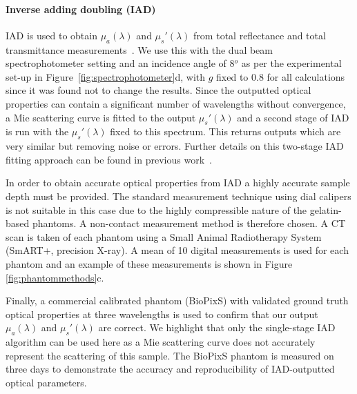 \paragraph{Inverse adding doubling (IAD)}\label{sec:methodsphantommeasure2}
IAD is used to obtain $\mu_a(\lambda)$ and $\mu_s'(\lambda)$ from total reflectance and total transmittance measurements~\citep{Prahl2017}. We use this with the dual beam spectrophotometer setting and an incidence angle of 8$^o$ as per the experimental set-up in Figure~\ref{fig:spectrophotometer}d, with $g$ fixed to 0.8 for all calculations since it was found not to change the results. Since the outputted optical properties can contain a significant number of wavelengths without convergence, a Mie scattering curve is fitted to the output $\mu_s'(\lambda)$ and a second stage of IAD is run with the $\mu_s'(\lambda)$ fixed to this spectrum.
This returns outputs which are very similar but removing noise or errors.
Further details on this two-stage IAD fitting approach can be found in previous work~\citep{Xie2021}. 

In order to obtain accurate optical properties from IAD a highly accurate sample depth must be provided. 
The standard measurement technique using dial calipers is not suitable in this case due to the highly compressible nature of the gelatin-based phantoms.
A non-contact measurement method is therefore chosen. A
CT scan is taken of each phantom using a Small Animal Radiotherapy System (SmART+, precision X-ray). A mean of 10 digital measurements is used for each phantom and an example of these measurements is shown in Figure \ref{fig:phantommethods}c.

Finally, a commercial calibrated phantom (BioPixS) with validated ground truth optical properties at three wavelengths is used to confirm that our output $\mu_a(\lambda)$ and $\mu_s'(\lambda)$ are correct. We highlight that only the single-stage IAD algorithm can be used here as a Mie scattering curve does not accurately represent the scattering of this sample. The BioPixS phantom is measured on three days to demonstrate the accuracy and reproducibility of IAD-outputted optical parameters.

